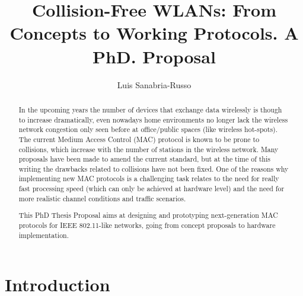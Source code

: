 \documentclass[]{llncs}
\begin{document}
\title{Collision-Free WLANs: From Concepts to Working Protocols. A PhD. Proposal}
\author{Luis Sanabria-Russo}
\maketitle

\begin{abstract}
In the upcoming years the number of devices that exchange data wirelessly is though to increase dramatically, even nowadays home environments no longer lack the wireless network congestion only seen before at office/public spaces (like wireless hot-spots). The current Medium Access Control (MAC) protocol is known to be prone to collisions, which increase with the number of stations in the wireless network. Many proposals have been made to amend the current standard, but at the time of this writing the drawbacks related to collisions have not been fixed. One of the reasons why implementing new MAC protocols is a challenging task relates to the need for really fast processing speed (which can only be achieved at hardware level) and the need for more realistic channel conditions and traffic scenarios.

This PhD Thesis Proposal aims at designing and prototyping next-generation MAC protocols for IEEE 802.11-like networks, going from concept proposals to hardware implementation.



\end{abstract}

\section{Introduction}\label{introduction}
	



\end{document}

